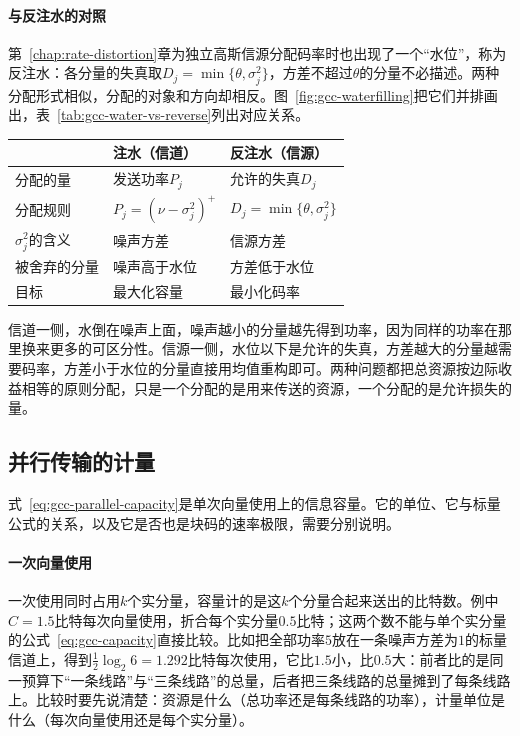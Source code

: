 \paragraph{与反注水的对照}
第~\ref{chap:rate-distortion}章为独立高斯信源分配码率时也出现了一个“水位”，称为反注水：各分量的失真取$D_j=\min\{\theta,\sigma_j^2\}$，方差不超过$\theta$的分量不必描述。两种分配形式相似，分配的对象和方向却相反。图~\ref{fig:gcc-waterfilling}把它们并排画出，表~\ref{tab:gcc-water-vs-reverse}列出对应关系。

\begin{BookInlineTable}
 \centering
 \caption{注水与反注水的对照}
 \label{tab:gcc-water-vs-reverse}
 \begin{tabular}{lll}
  \toprule
   & 注水（信道） & 反注水（信源） \\
  \midrule
  分配的量 & 发送功率$P_j$ & 允许的失真$D_j$ \\
  分配规则 & $P_j=(\nu-\sigma_j^2)^{+}$ & $D_j=\min\{\theta,\sigma_j^2\}$ \\
  $\sigma_j^2$的含义 & 噪声方差 & 信源方差 \\
  被舍弃的分量 & 噪声高于水位 & 方差低于水位 \\
  目标 & 最大化容量 & 最小化码率 \\
  \bottomrule
 \end{tabular}
\end{BookInlineTable}

信道一侧，水倒在噪声上面，噪声越小的分量越先得到功率，因为同样的功率在那里换来更多的可区分性。信源一侧，水位以下是允许的失真，方差越大的分量越需要码率，方差小于水位的分量直接用均值重构即可。两种问题都把总资源按边际收益相等的原则分配，只是一个分配的是用来传送的资源，一个分配的是允许损失的量。

\subsection{并行传输的计量}
\label{sec:gcc-parallel-accounting}

式~\eqref{eq:gcc-parallel-capacity}是单次向量使用上的信息容量。它的单位、它与标量公式的关系，以及它是否也是块码的速率极限，需要分别说明。

\paragraph{一次向量使用}
一次使用同时占用$k$个实分量，容量计的是这$k$个分量合起来送出的比特数。例中$C=1.5$比特每次向量使用，折合每个实分量$0.5$比特；这两个数不能与单个实分量的公式~\eqref{eq:gcc-capacity}直接比较。比如把全部功率$5$放在一条噪声方差为$1$的标量信道上，得到$\frac12\log_2 6=1.292$比特每次使用，它比$1.5$小，比$0.5$大：前者比的是同一预算下“一条线路”与“三条线路”的总量，后者把三条线路的总量摊到了每条线路上。比较时要先说清楚：资源是什么（总功率还是每条线路的功率），计量单位是什么（每次向量使用还是每个实分量）。

